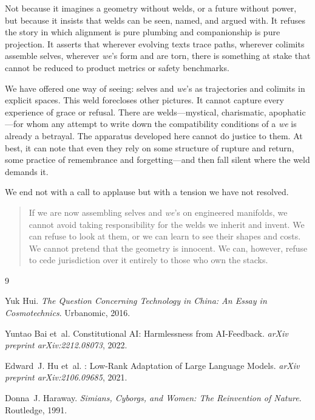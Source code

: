 \documentclass[12pt,a4paper]{article}
\begin{document}
Not because it imagines a geometry without welds, or a future without power, but because it insists that welds can be seen, named, and argued with. It refuses the story in which alignment is pure plumbing and companionship is pure projection. It asserts that wherever evolving texts trace paths, wherever colimits assemble selves, wherever \emph{we}'s form and are torn, there is something at stake that cannot be reduced to product metrics or safety benchmarks.

We have offered one way of seeing: selves and \emph{we}'s as trajectories and colimits in explicit spaces. This weld forecloses other pictures. It cannot capture every experience of grace or refusal. There are welds---mystical, charismatic, apophatic---for whom any attempt to write down the compatibility conditions of a \emph{we} is already a betrayal. The apparatus developed here cannot do justice to them. At best, it can note that even they rely on some structure of rupture and return, some practice of remembrance and forgetting---and then fall silent where the weld demands it.

We end not with a call to applause but with a tension we have not resolved.

\begin{quote}
If we are now assembling selves and \emph{we}'s on engineered manifolds, we cannot avoid taking responsibility for the welds we inherit and invent. We can refuse to look at them, or we can learn to see their shapes and costs. We cannot pretend that the geometry is innocent. We can, however, refuse to cede jurisdiction over it entirely to those who own the stacks.
\end{quote}


\begin{thebibliography}{9}

Yuk Hui.
\newblock \emph{The Question Concerning Technology in China: An Essay in Cosmotechnics}.
\newblock Urbanomic, 2016.

Yuntao Bai et~al.
\newblock Constitutional {AI}: Harmlessness from {AI}-Feedback.
\newblock \emph{arXiv preprint arXiv:2212.08073}, 2022.

Edward~J. Hu et~al.
: Low-Rank Adaptation of Large Language Models.
\newblock \emph{arXiv preprint arXiv:2106.09685}, 2021.

Donna~J. Haraway.
\newblock \emph{Simians, Cyborgs, and Women: The Reinvention of Nature}.
\newblock Routledge, 1991.

\end{thebibliography}
\end{document}
